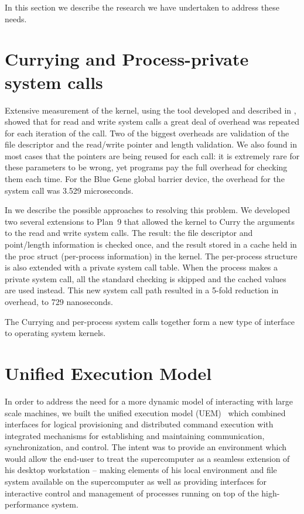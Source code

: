 In this section we describe the research we have undertaken to address these needs. 

\section{Currying and Process-private system calls}
Extensive measurement of the kernel, using the tool developed and described in \cite{plan9trace}, showed
that for read and write system calls a great deal of overhead was repeated for each iteration of the 
call. Two of the biggest overheads are validation of the file descriptor and the read/write pointer and 
length validation. We also found in most cases that the pointers are being reused for each call: it is extremely rare for these parameters to be wrong, yet programs pay the full overhead for checking them 
each time. For the Blue Gene global barrier device, the overhead for the system call was 3.529 microseconds. 

In \cite{currying} we describe the possible approaches to resolving this problem. We developed two 
several extensions to Plan~9 that allowed the kernel to Curry the arguments to the read and write
system calls. The result: the file descriptor and point/length information is checked once, and the
result stored in a cache held in the proc struct (per-process information) in the kernel. The per-process structure is 
also extended with a private system call table. When the process makes a private system
call, all the standard checking is skipped and the cached values are used instead. This 
new system call path resulted in a 5-fold reduction in overhead, to 729 nanoseconds. 

The Currying and per-process system calls together form a new type of interface to operating system
kernels. 

\section{Unified Execution Model}

In order to address the need for a more dynamic model of interacting with large scale machines,
we built the unified execution model (UEM)~\cite{uem} which combined interfaces for logical provisioning 
and distributed command execution with integrated mechanisms for establishing and maintaining 
communication, synchronization, and control.  The intent was to provide an environment which
would allow the end-user to treat the supercomputer as a seamless extension of his desktop
workstation -- making elements of his local environment and file system available on the 
supercomputer as well as providing interfaces for interactive control and management of 
processes running on top of the high-performance system.

